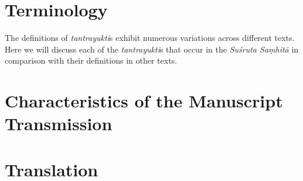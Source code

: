 \section{Terminology}

The definitions of \emph{tantrayukti}s exhibit numerous variations across different texts. Here we will discuss each of the \emph{tantrayukti}s that occur in the \emph{Suśruta Saṃhitā} in comparison with their definitions in other texts. 

\section{Characteristics of the Manuscript Transmission}


\section{Translation}

